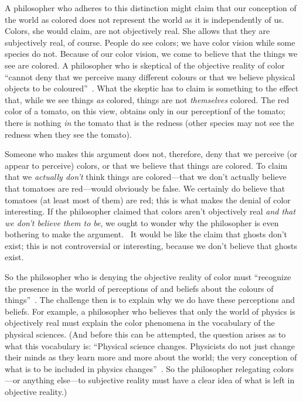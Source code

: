 \documentclass[11pt]{article}
\begin{document}
\begin{spacing}{1.5}
A philosopher who adheres to this distinction might claim that our
conception of the world as colored does not represent the world as it
is independently of us.  Colors, she would claim, are not objectively
real.  She allows that they are subjectively real, of course.  People
do see colors; we have color vision while some species do not.
Because of our color vision, we come to believe that the things we see
are colored.  A philosopher who is skeptical of the objective reality
of color ``cannot deny that we perceive many different colours or that
we believe physical objects to be coloured''~\citep[145]{stroud2000a}.
What the skeptic has to claim is something to the effect that, while
we see things {\em as} colored, things are not {\em themselves}
colored.  The red color of a tomato, on this view, obtains only in our
perceptionf of the tomato; there is nothing {\em in} the tomato that
is the redness (other species may not see the redness when they see
the tomato).
%

Someone who makes this argument does not, therefore, deny that we
perceive (or appear to perceive) colors, or that we believe that
things are colored.  To claim that we {\em actually don't} think
things are colored---that we don't actually believe that tomatoes are
red---would obviously be false.  We certainly do believe that tomatoes
(at least most of them) are red; this is what makes the denial of
color interesting.  If the philosopher claimed that colors aren't
objectively real {\em and that we don't believe them to be}, we ought
to wonder why the philosopher is even bothering to make the argument.
%
%
\ It would be like the claim that ghosts don't exist; this is not
controversial or interesting, because we don't believe that ghosts
exist.

So the philosopher who is denying the objective reality of color must
``recognize the presence in the world of perceptions of and beliefs
about the colours of things''~\citep[199]{stroud2000a}.  The challenge
then is to explain why we do have these perceptions and beliefs.  For
example, a philosopher who believes that only the world of physics is
objectively real must explain the color phenomena in the vocabulary of
the physical sciences.  (And before this can be attempted, the
question arises as to what this vocabulary is: ``Physical science
changes.  Physicists do not just change their minds as they learn more
and more about the world; the very conception of what is to be
included in physics changes''~\citep[53]{stroud2000a}.  So the
philosopher relegating colors---or anything else---to subjective
reality must have a clear idea of what is left in objective reality.)


\end{spacing}
\end{document}
